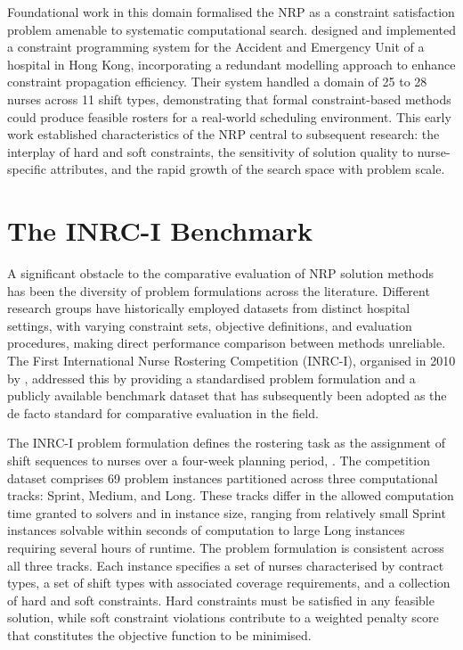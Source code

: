 \documentclass[12pt, a4paper, oneside]{report}
\begin{document}
Foundational work in this domain formalised the NRP as a constraint
satisfaction problem amenable to systematic computational search.
\citet{Cheng1997} designed and implemented a constraint programming
system for the Accident and Emergency Unit of a hospital in Hong
Kong, incorporating a redundant modelling approach to enhance
constraint propagation efficiency. Their system handled a domain of
25 to 28 nurses across 11 shift types, demonstrating that formal
constraint-based methods could produce feasible rosters for a
real-world scheduling environment. This early work established characteristics of the NRP central to subsequent research: the interplay of hard and soft constraints, the sensitivity of solution quality to nurse-specific attributes, and the rapid growth of the search space with problem scale.

\section{The INRC-I Benchmark}
\label{sec:inrc}

A significant obstacle to the comparative evaluation of NRP solution
methods has been the diversity of problem formulations across the
literature. Different research groups have historically employed
datasets from distinct hospital settings, with varying constraint
sets, objective definitions, and evaluation procedures, making direct
performance comparison between methods unreliable. The First
International Nurse Rostering Competition (INRC-I), organised in
2010 by \citet{Haspeslagh2014}, addressed this by providing a
standardised problem formulation and a publicly available benchmark
dataset that has subsequently been adopted as the de facto standard
for comparative evaluation in the field.

The INRC-I problem formulation defines the rostering task as the
assignment of shift sequences to nurses over a four-week planning
period, \citet{Haspeslagh2010}. The competition dataset comprises 69
problem instances partitioned across three computational tracks:
Sprint, Medium, and Long. These tracks differ in
the allowed computation time granted to solvers and in instance size,
ranging from relatively small Sprint instances solvable within
seconds of computation to large Long instances requiring
several hours of runtime. The problem formulation is consistent
across all three tracks. Each instance specifies a set of nurses
characterised by contract types, a set of shift types with associated
coverage requirements, and a collection of hard and soft constraints.
Hard constraints must be satisfied in any feasible solution, while
soft constraint violations contribute to a weighted penalty score
that constitutes the objective function to be minimised.
\end{document}
